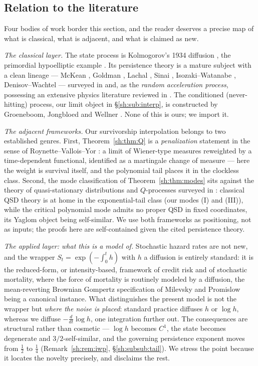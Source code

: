\documentclass[11pt]{article}
\numberwithin{equation}{section}
\theoremstyle{plain}
\theoremstyle{definition}
\theoremstyle{remark}
\begin{document}
\subsection*{Relation to the literature}

Four bodies of work border this section, and the reader deserves a
precise map of what is classical, what is adjacent, and what is claimed
as new.

\emph{The classical layer.} The state process is Kolmogorov's 1934
diffusion \cite{Kol34}, the primordial hypoelliptic example
\cite{Hor67}. Its persistence theory is a mature subject with a clean
lineage --- McKean \cite{McK63}, Goldman \cite{Gol71}, Lachal
\cite{Lac91}, Sinai \cite{Sin92}, Isozaki--Watanabe \cite{IW94},
Denisov--Wachtel \cite{DW15} --- surveyed in \cite{AS15} and, as the
\emph{random acceleration process}, possessing an extensive physics
literature reviewed in \cite{BMS13}. The conditioned (never-hitting)
process, our limit object in \S\ref{sh:sub:interp}, is constructed by
Groeneboom, Jongbloed and Wellner \cite{GJW99}. None of this is ours;
we import it.

\emph{The adjacent frameworks.} Our survivorship interpolation belongs
to two established genres. First, Theorem~\ref{sh:thm:Q} is a
\emph{penalization} statement in the sense of Roynette--Vallois--Yor
\cite{RVY06}: a limit of Wiener-type measures reweighted by a
time-dependent functional, identified as a martingale change of measure
--- here the weight is survival itself, and the polynomial tail places
it in the clockless class. Second, the mode classification of
Theorem~\ref{sh:thm:modes} sits against the theory of quasi-stationary
distributions and $Q$-processes surveyed in \cite{MV12}: classical QSD
theory is at home in the exponential-tail class (our modes (I) and
(III)), while the critical polynomial mode admits no proper QSD in fixed
coordinates, its Yaglom object being self-similar. We use both
frameworks as positioning, not as inputs; the proofs here are
self-contained given the cited persistence theory.

\emph{The applied layer: what this is a model of.} Stochastic hazard
rates are not new, and the wrapper $S_t=\exp(-\int_0^th)$ with $h$ a
diffusion is entirely standard: it is the reduced-form, or
intensity-based, framework of credit risk \cite{Lan04} and of stochastic
mortality, where the force of mortality is routinely modeled by a
diffusion, the mean-reverting Brownian Gompertz specification of Milevsky
and Promislow \cite{MP01} being a canonical instance. What distinguishes
the present model is not the wrapper but \emph{where the noise is
placed}: standard practice diffuses $h$ or $\log h$, whereas we diffuse
$-\tfrac{d}{dt}\log h$, one integration further out. The consequences are
structural rather than cosmetic --- $\log h$ becomes $C^1$, the state
becomes degenerate and $3/2$-self-similar, and the governing persistence
exponent moves from $\tfrac12$ to $\tfrac14$ (Remark~\ref{sh:rem:iwp},
\S\ref{sh:subsub:tail}). We stress the point because it locates the
novelty precisely, and disclaims the rest.
\end{document}

